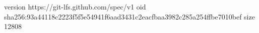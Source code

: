version https://git-lfs.github.com/spec/v1
oid sha256:93a44118c2223f5f5e54941f6aad3431c2eacfbaa3982c285a254ffbe7010bef
size 12808

